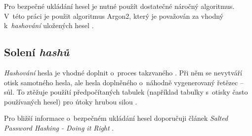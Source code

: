 Pro bezpečné ukládání hesel je nutné použít dostatečné náročný algoritmus. V~této práci je použit algoritmus Argon2, který je považován za vhodný k~\textit{hashování} uložených hesel \cite{hash_crackstation}.

\subsection{Solení \textit{hashů}}

\textit{Hashování} hesla je vhodné doplnit o~proces takzvaného . Při něm se nevytváří otisk samotného hesla, ale hesla doplněného o~náhodně vygenerovaný řetězec -- sůl. To ztěžuje použítí předpočítaných tabulek (například tabulky s~otisky často používaných hesel) pro útoky hrubou silou \cite{hash_crackstation}.

Pro bližší informace o~bezpečném ukládání hesel doporučuji článek \textit{Salted Password Hashing - Doing it Right} \cite{hash_crackstation}.

